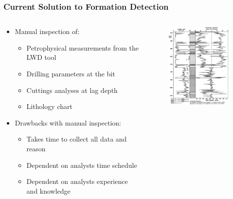\documentclass{beamer}
\begin{document}
\begin{frame} \frametitle{Current Solution to Formation Detection} 
\vspace{-1cm}
\begin{columns}[onlytextwidth]
\begin{column}{0.6\textwidth}\begin{itemize}
\item<1-> Manual inspection of: 
\begin{itemize}
\item<1-> Petrophysical measurements from the LWD tool
\item<1-> Drilling parameters at the bit
\item<1-> Cuttings analyses at lag depth
\item<1-> Lithology chart
\end{itemize}
\item<2-> Drawbacks with manual inspection: 
\begin{itemize}
\item<2-> Takes time to collect all data and reason
\item<2-> Dependent on analysts time schedule
\item<2-> Dependent on analysts experience and knowledge
\end{itemize}
\end{itemize}
\end{column}

\begin{column}{0.4\textwidth}
\begin{figure}
\begin{center}
\includegraphics [keepaspectratio,width = 4.7cm] {lithologyGamma.png}
\end{center}
\end{figure}
\end{column}
\end{columns}
\end{frame}
\end{document}
